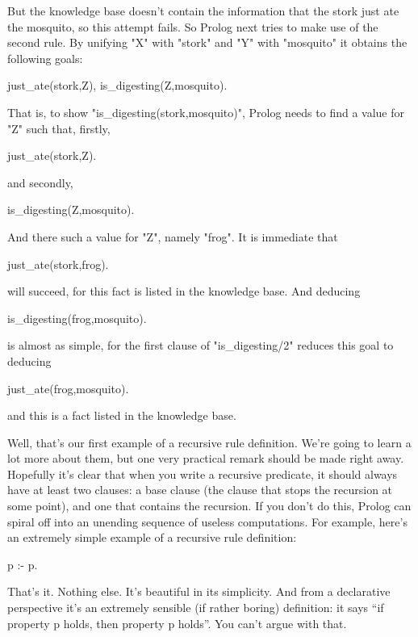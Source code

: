 But the knowledge base doesn't contain the information that the stork
just ate the mosquito, so this
attempt fails.  So Prolog next tries to make use of the second rule.
By unifying "X" with "stork" and "Y" with
"mosquito" it obtains the following goals:
\begin{LPNcodedisplay}
just_ate(stork,Z),
is_digesting(Z,mosquito).
\end{LPNcodedisplay}
That is, to show
"is_digesting(stork,mosquito)", Prolog
needs to find a value for "Z" such that, firstly,
\begin{LPNcodedisplay}
just_ate(stork,Z).
\end{LPNcodedisplay}
and secondly,
\begin{LPNcodedisplay}
is_digesting(Z,mosquito).
\end{LPNcodedisplay}
And there  such a value for "Z", namely
"frog".  It is immediate that
\begin{LPNcodedisplay}
just_ate(stork,frog).
\end{LPNcodedisplay}
will succeed, for this fact is listed in the knowledge base.  And deducing
\begin{LPNcodedisplay}
is_digesting(frog,mosquito).
\end{LPNcodedisplay}
is almost as simple, for the first clause of "is_digesting/2"
reduces this goal to deducing
\begin{LPNcodedisplay}
just_ate(frog,mosquito).
\end{LPNcodedisplay}
and this is a fact listed in the knowledge base.

Well, that's our first example of a recursive rule definition.  We're
going to learn a lot more about them, but one very practical remark
should be made right away.  Hopefully it's clear that when you write a
recursive predicate, it should always have at least two clauses: a
base clause (the clause that stops the recursion at some point), and
one that contains the recursion.  If you don't do this, Prolog can
spiral off into an unending sequence of useless computations.  For
example, here's an extremely simple example of a recursive rule
definition:
\begin{LPNcodedisplay}
p :- p.
\end{LPNcodedisplay}
That's it.  Nothing else.  It's beautiful in its simplicity.  And from
a declarative perspective it's an extremely sensible (if rather
boring) definition: it says ``if property p holds, then property
p holds''. You can't argue with that.

